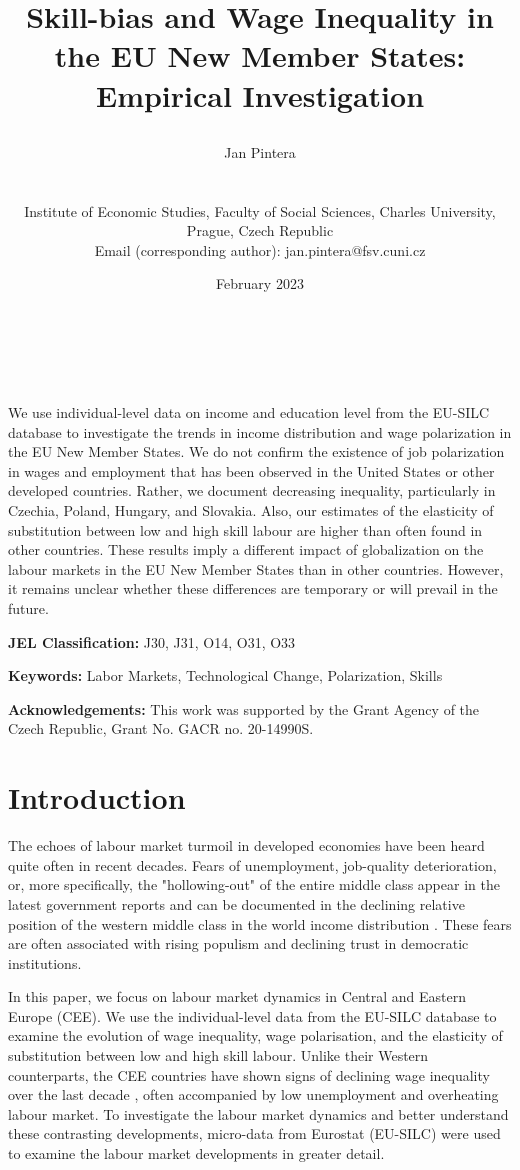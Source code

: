 \documentclass[11pt]{article}
\title{\begin{LARGE}Skill-bias and Wage Inequality in the EU New Member States: Empirical Investigation\end{LARGE}}
\author{    
    \begin{large}Jan Pintera\end{large} \\\vspace{5mm} \begin{small} Institute of Economic Studies, Faculty of Social Sciences, Charles University,\\ Prague, Czech Republic\\
    Email (corresponding author): jan.pintera@fsv.cuni.cz \end{small}
}
\date{February 2023}
\makeatletter
\renewcommand{\maketitle}{\bgroup\setlength{\parindent}{0pt}
\begin{flushright}
  \textbf{\@title}\\
  \vspace{5mm}
  \@author\\
  \vspace{5mm}
  \@date
\end{flushright}\egroup
}
\renewenvironment{abstract}
 {\small
  \begin{flushleft}
  \bfseries \abstractname\vspace{-.5em}\vspace{0pt}
  \end{flushleft}
  \list{}{%
    \setlength{\leftmargin}{0mm}%
    \setlength{\rightmargin}{\leftmargin}%
  }%
  \item\relax}
 {\endlist}
\def \jel {	J30, J31, O14, O31, O33}
\def \Keywords {Labor Markets, Technological Change, Polarization, Skills}
\makeatother
\begin{document}
\maketitle

\thispagestyle{empty}
\begin{abstract}
We use individual-level data on income and education level from the EU-SILC database to investigate the trends in income distribution and wage polarization in the EU New Member States. We do not confirm the existence of job polarization in wages and employment that has been observed in the United States or other developed countries. Rather, we document decreasing inequality, particularly in Czechia, Poland, Hungary, and Slovakia. Also, our estimates of the elasticity of substitution between low and 
high skill labour are higher than often found in other countries. These results imply a different impact of globalization on the labour markets in the EU New Member States than in other countries. However, it remains unclear whether these differences are temporary or will prevail in the future.
\bigskip

\textbf{JEL Classification:} \jel

\textbf{Keywords:}  \Keywords

\bigskip
\textbf{Acknowledgements:}
This work was supported by the Grant Agency of the Czech Republic, Grant No. GACR no. 20-14990S. 

\end{abstract}
\clearpage
\setcounter{page}{1}



\section{Introduction}
The echoes of labour market turmoil in developed economies have been heard quite often in recent decades. Fears of unemployment, job-quality deterioration, or, more specifically, the "hollowing-out" of the entire middle class appear in the latest government reports \citetext{e.g., \citealt{rodrik2020economic}} and can be documented in the declining relative position of the western middle class in the world income distribution \citep{milanovic2020elephant}. These fears are often associated with rising populism and declining trust in democratic institutions.

In this paper, we focus on labour market dynamics in Central and Eastern Europe (CEE). We use the individual-level data from the EU-SILC database to examine the evolution of wage inequality, wage polarisation, and the elasticity of substitution between low and high skill labour. Unlike their Western counterparts, the CEE countries have shown signs of declining wage inequality over the last decade \citep{magda2021firms}, often accompanied by low unemployment and overheating labour market. To investigate the labour market dynamics and better understand these contrasting developments, micro-data from Eurostat (EU-SILC) were used to examine the labour market developments in greater detail.
\end{document}
